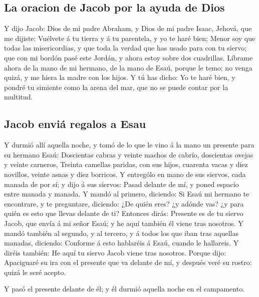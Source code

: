 \hypertarget{la-oracion-de-jacob-por-la-ayuda-de-dios}{%
\subsection{La oracion de Jacob por la ayuda de
Dios}\label{la-oracion-de-jacob-por-la-ayuda-de-dios}}

 Y dijo Jacob: Dios de mi padre Abraham, y Dios de mi padre
Isaac, Jehová, que me dijiste: Vuélvete á tu tierra y á tu parentela, y
yo te haré bien;  Menor soy que todas las misericordias, y
que toda la verdad que has usado para con tu siervo; que con mi bordón
pasé este Jordán, y ahora estoy sobre dos cuadrillas. 
Líbrame ahora de la mano de mi hermano, de la mano de Esaú, porque le
temo; no venga quizá, y me hiera la madre con los hijos.  Y
tú has dicho: Yo te haré bien, y pondré tu simiente como la arena del
mar, que no se puede contar por la multitud.

\hypertarget{jacob-enviuxe1-regalos-a-esau}{%
\subsection{Jacob enviá regalos a
Esau}\label{jacob-enviuxe1-regalos-a-esau}}

 Y durmió allí aquella noche, y tomó de lo que le vino á la
mano un presente para su hermano Esaú:  Doscientas cabras y
veinte machos de cabrío, doscientas ovejas y veinte carneros,
 Treinta camellas paridas, con sus hijos, cuarenta vacas y
diez novillos, veinte asnas y diez borricos.  Y entrególo
en mano de sus siervos, cada manada de por sí; y dijo á sus siervos:
Pasad delante de mí, y poned espacio entre manada y manada.
 Y mandó al primero, diciendo: Si Esaú mi hermano te
encontrare, y te preguntare, diciendo: ¿De quién eres? ¿y adónde vas? ¿y
para quién es esto que llevas delante de ti?  Entonces
dirás: Presente es de tu siervo Jacob, que envía á mi señor Esaú; y he
aquí también él viene tras nosotros.  Y mandó también al
segundo, y al tercero, y á todos los que iban tras aquellas manadas,
diciendo: Conforme á esto hablaréis á Esaú, cuando le hallareis.
 Y diréis también: He aquí tu siervo Jacob viene tras
nosotros. Porque dijo: Apaciguaré su ira con el presente que va delante
de mí, y después veré su rostro: quizá le seré acepto.

 Y pasó el presente delante de él; y él durmió aquella
noche en el campamento.

